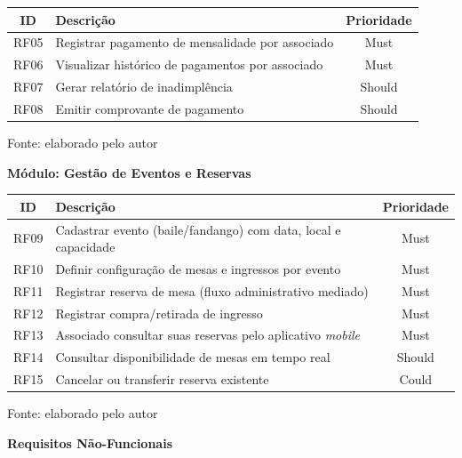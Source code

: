 ﻿\documentclass[12pt,a4paper]{article}
\newcommand{\fonte}[1]{\par\vspace{2pt}\footnotesize{Fonte: #1}}
\begin{document}
\begin{center}
\label{tab:rf-mensalidades}
\begin{tabular}{clc}
\hline
\textbf{ID} & \textbf{Descrição} & \textbf{Prioridade} \\
\hline
RF05 & Registrar pagamento de mensalidade por associado & Must \\
RF06 & Visualizar histórico de pagamentos por associado & Must \\
RF07 & Gerar relatório de inadimplência & Should \\
RF08 & Emitir comprovante de pagamento & Should \\
\hline
\end{tabular}
\fonte{elaborado pelo autor}
\end{center}

\textbf{Módulo: Gestão de Eventos e Reservas}

\begin{center}
\label{tab:rf-eventos}
\begin{tabular}{clc}
\hline
\textbf{ID} & \textbf{Descrição} & \textbf{Prioridade} \\
\hline
RF09 & Cadastrar evento (baile/fandango) com data, local e capacidade & Must \\
RF10 & Definir configuração de mesas e ingressos por evento & Must \\
RF11 & Registrar reserva de mesa (fluxo administrativo mediado) & Must \\
RF12 & Registrar compra/retirada de ingresso & Must \\
RF13 & Associado consultar suas reservas pelo aplicativo \textit{mobile} & Must \\
RF14 & Consultar disponibilidade de mesas em tempo real & Should \\
RF15 & Cancelar ou transferir reserva existente & Could \\
\hline
\end{tabular}
\fonte{elaborado pelo autor}
\end{center}

\textbf{Requisitos Não-Funcionais}
\end{document}
